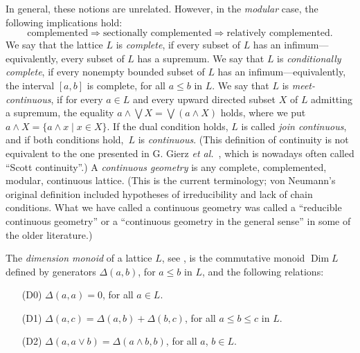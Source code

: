 \documentclass[psamsfonts,reqno]{memo-l}
\theoremstyle{plain}
\theoremstyle{definition}
\theoremstyle{remark}
\numberwithin{equation}{section}
\newcommand{\DD}{\Delta}
\DeclareMathOperator{\Dim}{Dim}
\newcommand{\set}[1]{\{#1\}}
\newcommand{\setm}[2]{\set{#1\mid#2}}
\begin{document}
In general, these notions are unrelated. However, in the \emph{modular} case,
the following implications hold:
   \[
   \text{complemented}\Rightarrow\text{sectionally complemented}
   \Rightarrow\text{relatively complemented}.
   \]
We say that the lattice $L$ is \emph{complete}, if every subset of $L$ has
an infimum---equivalently, every subset of $L$ has a supremum. We say that
$L$ is \emph{conditionally complete}, if every nonempty bounded subset of $L$
has an infimum---equivalently, the interval $[a,b]$ is complete, for all
$a\leq b$ in $L$. We say that
$L$ is \emph{meet-continuous}, if for every $a\in L$ and every upward
directed subset $X$ of $L$ admitting a supremum, the equality
$a\wedge\bigvee X=\bigvee(a\wedge X)$ holds, where we put
$a\wedge X=\setm{a\wedge x}{x\in X}$. If the dual condition holds, $L$ is
called 
\emph{join continuous}, and if both conditions hold,~$L$ is
\emph{continuous}. (This definition of continuity is not equivalent
to the one presented in G. Gierz \emph{et al.}~\cite{Comp},
%
%
which is 
nowadays often called ``Scott continuity''.)
A \emph{continuous geometry} is any complete,
complemented, modular, continuous lattice. (This is the current
terminology; von Neumann's original definition included hypotheses of
irreducibility and lack of chain conditions. What we have called a
continuous geometry was called a ``reducible continuous geometry'' or a
``continuous geometry in the general sense'' in some of the older
literature.)

The \emph{dimension monoid}
of a lattice $L$, see \cite{WDim}, is the
commutative monoid $\Dim L$\index{dzzimL@$\Dim L$|ii} defined by generators
\index{dzzeltab@$\DD(a,b)$|ii}$\DD(a,b)$, for $a\leq b$ in
$L$, and the following relations:
\begin{itemize}
\item[(D0)] $\DD(a,a)=0$, for all $a\in L$.

\item[(D1)] $\DD(a,c)=\DD(a,b)+\DD(b,c)$, for all $a\leq b\leq c$ in $L$.

\item[(D2)] $\DD(a,a\vee b)=\DD(a\wedge b,b)$, for all $a$, $b\in L$.
\end{itemize}
\end{document}
